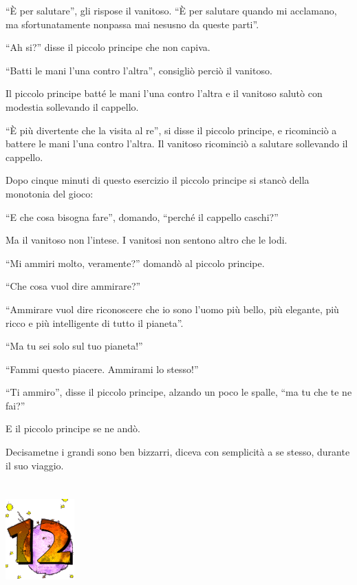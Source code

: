 \documentclass[11pt]{scrbook}
\begin{document}
``È per salutare'', gli rispose il vanitoso. ``È per salutare quando mi acclamano, ma sfortunatamente nonpassa mai nesusno da queste parti''.

``Ah si?'' disse il piccolo principe che non capiva.

``Batti le mani l'una contro l'altra'', consigliò perciò il vanitoso.

Il piccolo principe batté le mani l'una contro l'altra e il vanitoso salutò con modestia sollevando il cappello.

``È più divertente che la visita al re'', si disse il piccolo principe, e ricominciò a battere le mani l'una contro l'altra. Il vanitoso ricominciò a salutare sollevando il cappello.

Dopo cinque minuti di questo esercizio il piccolo principe si stancò della monotonia del gioco:

``E che cosa bisogna fare'', domando, ``perché il cappello caschi?''

Ma il vanitoso non l'intese. I vanitosi non sentono altro che le lodi.

``Mi ammiri molto, veramente?'' domandò al piccolo principe.

``Che cosa vuol dire ammirare?''

``Ammirare vuol dire riconoscere che io sono l'uomo più bello, più elegante, più ricco e più intelligente di tutto il pianeta''.

``Ma tu sei solo sul tuo pianeta!''

``Fammi questo piacere. Ammirami lo stesso!''

``Ti ammiro'', disse il piccolo principe, alzando un poco le spalle, ``ma tu che te ne fai?''

E il piccolo principe se ne andò.

Decisametne i grandi sono ben bizzarri, diceva con semplicità a se stesso, durante il suo viaggio.

\chapter{}
\begin{center}
\includegraphics{img/chapter12}
\end{center}
\end{document}
